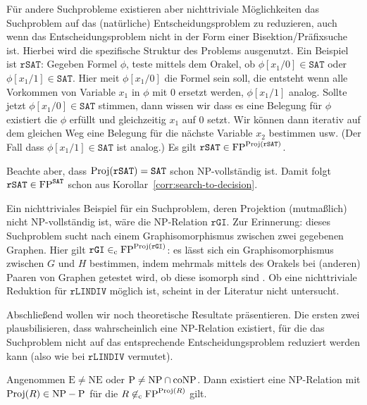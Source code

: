 Für andere Suchprobleme existieren aber nichttriviale Möglichkeiten  das Suchproblem auf das (natürliche) Entscheidungsproblem zu reduzieren, auch wenn das Entscheidungsproblem nicht in der Form einer Bisektion/Präfixsuche ist. Hierbei wird die spezifische Struktur des Problems ausgenutzt. Ein Beispiel ist $\mathtt{rSAT}$: Gegeben Formel $\phi$, teste mittels dem Orakel, ob $\phi[x_1/0]\in\mathtt{SAT}$ oder $\phi[x_1/1]\in\mathtt{SAT}$. Hier meit $\phi[x_1/0]$ die Formel sein soll, die entsteht wenn alle Vorkommen von Variable $x_1$ in $\phi$ mit $0$ ersetzt werden, $\phi[x_1/1]$ analog. Sollte jetzt $\phi[x_1/0]\in\mathtt{SAT}$ stimmen, dann wissen wir dass es eine Belegung für $\phi$ existiert die $\phi$ erfüllt und gleichzeitig $x_1$ auf $0$ setzt. Wir können dann iterativ auf dem gleichen Weg eine Belegung für die nächste Variable $x_2$ bestimmen usw. (Der Fall dass $\phi[x_1/1]\in\mathtt{SAT}$ ist analog.) Es gilt $\mathtt{rSAT}\in\mathrm{FP}^{\operatorname{Proj}(\mathtt{rSAT})}$.

Beachte aber, dass $\operatorname{Proj}(\mathtt{rSAT})=\mathtt{SAT}$ schon NP-vollständig ist. Damit folgt $\mathtt{rSAT}\in \mathrm{FP}^{\mathtt{SAT}}$ schon aus Korollar~\ref{corr:search-to-decision}.

Ein nichttriviales Beispiel für ein Suchproblem, deren Projektion (mutmaßlich) nicht NP-vollständig ist, wäre die NP-Relation $\mathtt{rGI}$. Zur Erinnerung: dieses Suchproblem sucht nach einem Graphisomorphismus zwischen zwei gegebenen Graphen.
Hier gilt $\mathtt{rGI}\in_\mathrm{c} \mathrm{FP}^{\operatorname{Proj}(\mathtt{rGI})}$: es lässt sich ein Graphisomorphismus zwischen $G$ und $H$ bestimmen, indem mehrmals mittels des Orakels bei (anderen) Paaren von  Graphen getestet wird, ob diese isomorph sind \parencite[vgl.][S. 65, 100]{goldreich_computational_2008}.
Ob eine nichttriviale Reduktion für $\mathtt{rLINDIV}$ möglich ist, scheint in der Literatur nicht untersucht.

Abschließend wollen wir noch theoretische Resultate präsentieren. Die ersten zwei plausbilisieren, dass wahrscheinlich eine NP-Relation existiert, für die das Suchproblem nicht auf das entsprechende Entscheidungsproblem reduziert werden kann (also wie bei $\mathtt{rLINDIV}$ vermutet).

\begin{theorem}
    Angenommen $\mathrm{E\neq NE}$ oder $\mathrm{P}\neq \mathrm{NP}\cap\mathrm{coNP}$. Dann existiert eine NP-Relation mit $\operatorname{Proj}(R)\in \mathrm{NP}-\mathrm{P}$ für die $R\not\in_\mathrm{c}\mathrm{FP}^{\operatorname{Proj}(R)}$ gilt.
\end{theorem}


